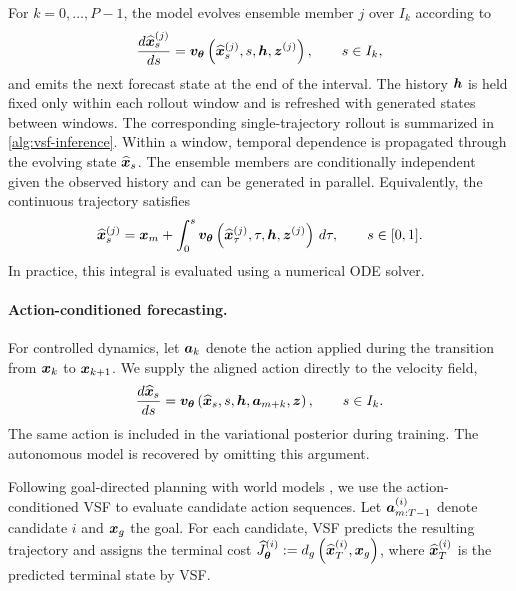 \documentclass{article} %
\numberwithin{equation}{section}
\begin{document}
For $k=0,\ldots,P-1$, the model evolves ensemble member $j$ over
$I_k$ according to
\begin{equation}
    \frac{d\widehat{{\bm{x}}}_s^{(j)}}{ds}
    =
    {\bm{v}}_{{\bm{\theta}}}
    \left(
        \widehat{{\bm{x}}}_s^{(j)},
        s,
        {\bm{h}},
        {\bm{z}}^{(j)}
    \right),
    \qquad s\in I_k,
    \label{eq:vsf_inference_ode}
\end{equation}
and emits the next forecast state at the end of the interval. 
The history ${\bm{h}}$ is held fixed only within each rollout
window and is refreshed with generated states between windows. The
corresponding single-trajectory rollout is summarized in
\cref{alg:vsf-inference}. Within a window, temporal dependence is propagated
through the evolving state $\widehat{{\bm{x}}}_s$. The
ensemble members are conditionally independent given the observed history and
can be generated in parallel. Equivalently, the continuous trajectory satisfies
\begin{equation}
    \widehat{{\bm{x}}}_s^{(j)}
    =
    {\bm{x}}_m
    +
    \int_0^s
    {\bm{v}}_{{\bm{\theta}}}
    \left(
        \widehat{{\bm{x}}}_\tau^{(j)},
        \tau,
        {\bm{h}},
        {\bm{z}}^{(j)}
    \right)
    \,d\tau,
    \qquad s\in[0,1].
    \label{eq:vsf_integral_solution}
\end{equation}
In practice, this integral is evaluated using a numerical ODE solver.

\paragraph{Action-conditioned forecasting.}
For controlled dynamics, let ${\bm{a}}_k$ denote the action applied during the
transition from ${\bm{x}}_k$ to ${\bm{x}}_{k+1}$. We supply the aligned action directly
to the velocity field,
\begin{equation}
    \frac{d\widehat{{\bm{x}}}_s}{ds}
    =
    {\bm{v}}_{{\bm{\theta}}}
    \left(
        \widehat{{\bm{x}}}_s,
        s,
        {\bm{h}},
        {\bm{a}}_{m+k},
        {\bm{z}}
    \right),
    \qquad
    s\in I_k.
    \label{eq:vsf_action_conditioned_dynamics}
\end{equation}
The same action is included in the variational posterior during training.
The autonomous model is recovered by omitting this argument.



Following goal-directed planning with world models \citep{zhou2025dinowm,maes2026leworldmodel}, we use the action-conditioned VSF to evaluate candidate action sequences. Let ${\bm{a}}_{m:T-1}^{(i)}$ denote candidate $i$ and ${\bm{x}}_g$ the goal. For each candidate, VSF predicts the resulting trajectory and assigns the terminal cost $\widehat J_{{\bm{\theta}}}^{(i)} := d_g\left(\widehat{{\bm{x}}}_T^{(i)},{\bm{x}}_g\right)$, where $\widehat{{\bm{x}}}_T^{(i)}$ is the predicted terminal state by VSF.
\end{document}
